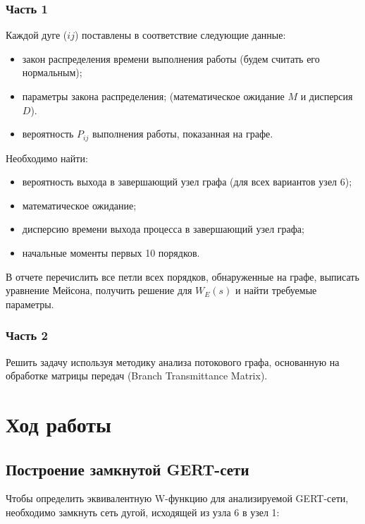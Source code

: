\documentclass[14pt,a4paper,report]{report}
\begin{document}
\subsubsection{Часть 1}

Каждой дуге ($ij$) поставлены в соответствие следующие данные:

\begin{itemize}
	\item закон распределения времени выполнения работы (будем считать его нормальным);
	\item параметры закона распределения; (математическое ожидание $M$ и дисперсия $D$).
	\item вероятность $P_{ij}$ выполнения работы, показанная на графе.
\end{itemize}

Необходимо найти:

\begin{itemize}
	\item вероятность выхода в завершающий узел графа (для всех вариантов узел 6);
	\item математическое ожидание;
	\item дисперсию времени выхода процесса в завершающий узел графа;
		\item начальные моменты первых 10 порядков.
\end{itemize}

В отчете перечислить все петли всех порядков, обнаруженные на графе, выписать уравнение Мейсона, получить решение для $W_E(s)$ и найти требуемые параметры.

\subsubsection{Часть 2}

Решить задачу используя методику анализа потокового графа, основанную на обработке матрицы передач (Branch Transmittance Matrix).

\clearpage

\section{Ход работы}

\subsection{Построение замкнутой GERT-сети}

Чтобы определить эквивалентную W-функцию для анализируемой GERT-сети, необходимо замкнуть сеть дугой, исходящей из узла 6 в узел 1:
\end{document}
